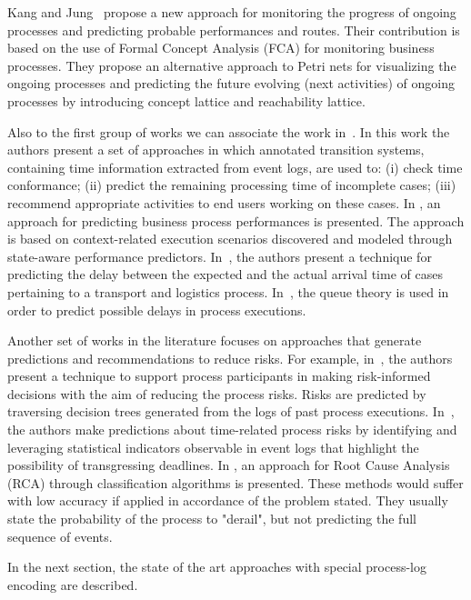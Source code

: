 Kang and Jung~\cite{doi:10.1108/02635571111137241} propose a new approach for monitoring the progress of ongoing processes and predicting probable performances and routes. Their contribution is based on the use of Formal Concept Analysis (FCA) for monitoring business processes. They propose an alternative approach to Petri nets for visualizing the ongoing processes and predicting the future evolving (next activities) of ongoing processes by introducing concept lattice and reachability lattice.   

Also to the first group of works we can associate the work in~\cite{DBLP:journals/is/AalstSS11}. In this work the authors present a set of approaches in which annotated transition systems, containing time information extracted from event logs, are used to: (i) check time conformance;
(ii) predict the remaining processing time of incomplete cases; (iii) recommend appropriate activities to end users working on these cases. In \cite{Folino}, an approach for predicting business process performances is presented. The approach is based on context-related execution scenarios discovered and modeled through state-aware performance predictors. In~\cite{Metzgeretal12}, the authors present a technique for predicting the delay between the expected and the actual arrival time of cases pertaining to a transport and logistics process. In~\cite{Senderovichetal15}, the queue theory is used in order to predict possible delays in process executions.

Another set of works in the literature focuses on approaches that generate predictions and recommendations to reduce risks. For example, in~\cite{DBLP:conf/caise/ConfortiLRA13}, the authors present a technique to support process participants in making risk-informed decisions with the aim of reducing the process risks. Risks are predicted by traversing decision trees generated from the logs of past process executions. In~\cite{Pika}, the authors make predictions about time-related process risks by identifying and leveraging statistical indicators observable in event logs  that highlight the possibility of transgressing deadlines.
In \cite{suriadi}, an approach for Root Cause Analysis (RCA) through classification algorithms is presented. These methods would suffer with low accuracy if applied in accordance of the problem stated. They usually state the probability of the process to "derail", but not predicting the full sequence of events. 


In the next section, the state of the art approaches with special process-log encoding are described.




